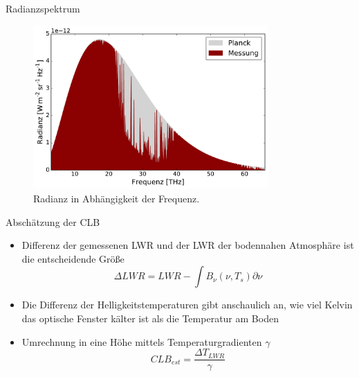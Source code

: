 \documentclass{beamer}
\begin{document}
\begin{frame}{Radianzspektrum}
\begin{figure}[ht]
    \centering
    \includegraphics[width=0.8\textwidth]{figures/spectrum.pdf}
    \caption{Radianz in Abhängigkeit der Frequenz.}
    \label{fig:spectrum}
\end{figure}
\end{frame}

\begin{frame}{Abschätzung der CLB}
\begin{itemize}
  \vfill\item Differenz der gemessenen LWR und der LWR der bodennahen
      Atmosphäre ist die entscheidende Größe
      \[ \Delta LWR = LWR - \int B_\nu(\nu, T_s) \partial\nu \]
  \vfill\item Die Differenz der Helligkeitstemperaturen gibt anschaulich an,
      wie viel Kelvin das optische Fenster kälter ist als die Temperatur am
      Boden
  \vfill\item Umrechnung in eine Höhe mittels Temperaturgradienten $\gamma$
      \[ CLB_{est} = \frac{\Delta T_{LWR}}{\gamma} \]
  \vfill
\end{itemize}
\end{frame}
\end{document}
